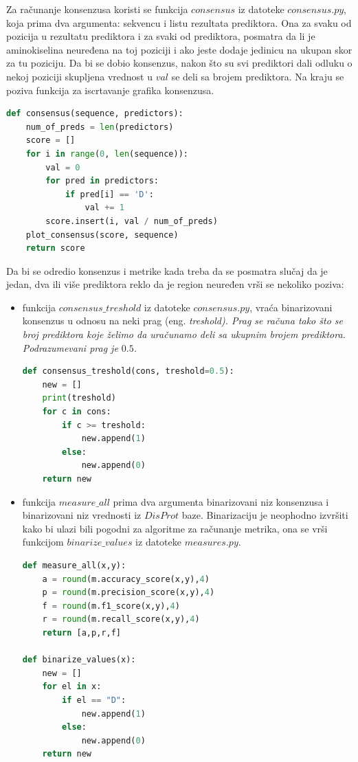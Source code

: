 \begin{enumerate}
\begin{lstlisting}[language=Python]
\end{lstlisting}
Za računanje konsenzusa koristi se funkcija $consensus$ iz datoteke $consensus.py$, koja prima dva argumenta: sekvencu i listu rezultata prediktora. Ona za svaku od pozicija u rezultatu prediktora i za svaki od prediktora, posmatra da li je  aminokiselina neuređena na toj poziciji i ako jeste dodaje jedinicu na ukupan skor za tu poziciju. Da bi se dobio konsenzus, nakon što su svi prediktori dali odluku o nekoj poziciji skupljena vrednost u $val$ se deli sa brojem prediktora. Na kraju se poziva funkcija za iscrtavanje grafika konsenzusa.
\begin{lstlisting}[language=Python]
def consensus(sequence, predictors):
    num_of_preds = len(predictors)
    score = []
    for i in range(0, len(sequence)):
        val = 0
        for pred in predictors:
            if pred[i] == 'D':
                val += 1
        score.insert(i, val / num_of_preds)
    plot_consensus(score, sequence)
    return score
\end{lstlisting}
Da bi se odredio konsenzus i metrike kada treba da se posmatra slučaj da je jedan, dva ili više prediktora reklo da je region neuređen vrši se nekoliko poziva:
\begin{itemize}
\item funkcija $consensus\_treshold$ iz datoteke $consensus.py$, vraća binarizovani konsenzus u odnosu na neki prag (eng. \em{treshold}). Prag se računa tako što se broj prediktora koje želimo da uračunamo deli sa ukupnim brojem prediktora. Podrazumevani prag je $0.5$.
\begin{lstlisting}[language=Python]
def consensus_treshold(cons, treshold=0.5):
    new = []
    print(treshold)
    for c in cons:
        if c >= treshold:
            new.append(1)
        else:
            new.append(0)
    return new
\end{lstlisting}
\item funkcija $measure\_all$ prima dva argumenta binarizovani niz konsenzusa i binarizovani niz vrednosti iz $DisProt$ baze. Binarizaciju je neophodno izvršiti kako bi ulazi bili pogodni za algoritme za računanje metrika, ona se vrši funkcijom $binarize\_values$ iz datoteke $measures.py$.
\begin{lstlisting}[language=Python]
def measure_all(x,y):
    a = round(m.accuracy_score(x,y),4)
    p = round(m.precision_score(x,y),4)
    f = round(m.f1_score(x,y),4)
    r = round(m.recall_score(x,y),4)
    return [a,p,r,f]
    
def binarize_values(x):
    new = []
    for el in x:
        if el == "D":
            new.append(1)
        else:
            new.append(0)
    return new
\end{lstlisting}
\end{itemize}


\end{enumerate}
